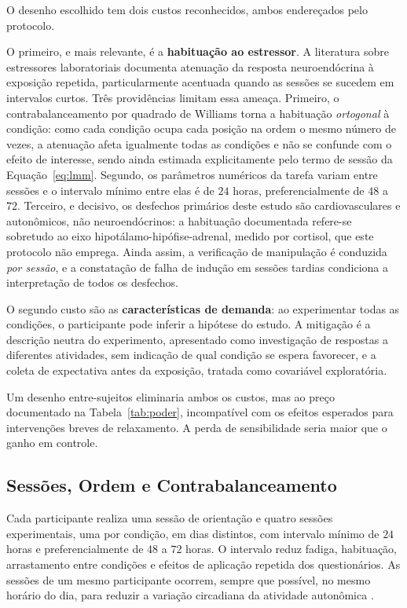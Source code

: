 O desenho escolhido tem dois custos reconhecidos, ambos endereçados pelo protocolo.

O primeiro, e mais relevante, é a \textbf{habituação ao estressor}. A literatura sobre estressores laboratoriais documenta atenuação da resposta neuroendócrina à exposição repetida, particularmente acentuada quando as sessões se sucedem em intervalos curtos. Três providências limitam essa ameaça. Primeiro, o contrabalanceamento por quadrado de Williams torna a habituação \emph{ortogonal} à condição: como cada condição ocupa cada posição na ordem o mesmo número de vezes, a atenuação afeta igualmente todas as condições e não se confunde com o efeito de interesse, sendo ainda estimada explicitamente pelo termo de sessão da Equação~\ref{eq:lmm}. Segundo, os parâmetros numéricos da tarefa variam entre sessões e o intervalo mínimo entre elas é de $24$ horas, preferencialmente de $48$ a $72$. Terceiro, e decisivo, os desfechos primários deste estudo são cardiovasculares e autonômicos, não neuroendócrinos: a habituação documentada refere-se sobretudo ao eixo hipotálamo-hipófise-adrenal, medido por cortisol, que este protocolo não emprega. Ainda assim, a verificação de manipulação é conduzida \emph{por sessão}, e a constatação de falha de indução em sessões tardias condiciona a interpretação de todos os desfechos.

O segundo custo são as \textbf{características de demanda}: ao experimentar todas as condições, o participante pode inferir a hipótese do estudo. A mitigação é a descrição neutra do experimento, apresentado como investigação de respostas a diferentes atividades, sem indicação de qual condição se espera favorecer, e a coleta de expectativa antes da exposição, tratada como covariável exploratória.

Um desenho entre-sujeitos eliminaria ambos os custos, mas ao preço documentado na Tabela~\ref{tab:poder}, incompatível com os efeitos esperados para intervenções breves de relaxamento. A perda de sensibilidade seria maior que o ganho em controle.

\subsection{Sessões, Ordem e Contrabalanceamento}\label{subsec:sessoes}

Cada participante realiza uma sessão de orientação e quatro sessões experimentais, uma por condição, em dias distintos, com intervalo mínimo de $24$ horas e preferencialmente de $48$ a $72$ horas. O intervalo reduz fadiga, habituação, arrastamento entre condições e efeitos de aplicação repetida dos questionários. As sessões de um mesmo participante ocorrem, sempre que possível, no mesmo horário do dia, para reduzir a variação circadiana da atividade autonômica \citep{Laborde2017}.


